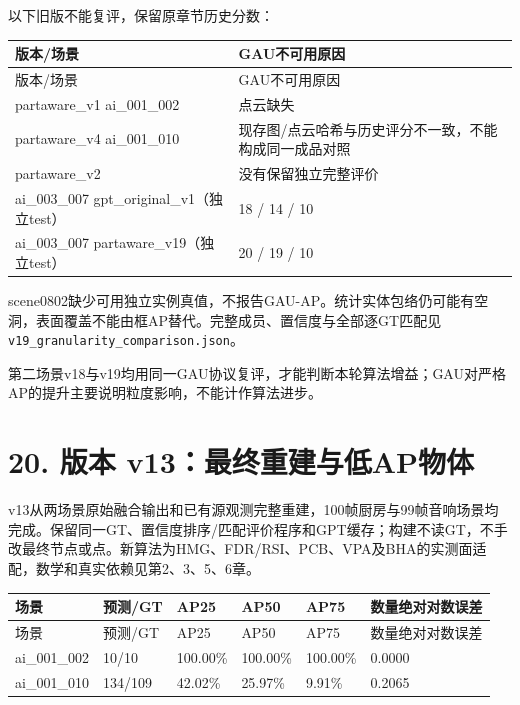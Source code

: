 \documentclass[UTF8,fontset=fandol]{ctexart}
\begin{document}
以下旧版不能复评，保留原章节历史分数：



{\small
\begin{longtable}{|p{}|p{}|}
\hline
版本/场景 & GAU不可用原因 \\ \hline
\endfirsthead
\hline
版本/场景 & GAU不可用原因 \\ \hline
\endhead
partaware\_v1 ai\_001\_002 & 点云缺失 \\ \hline
partaware\_v4 ai\_001\_010 & 现存图/点云哈希与历史评分不一致，不能构成同一成品对照 \\ \hline
partaware\_v2 & 没有保留独立完整评价 \\ \hline
ai\_003\_007 gpt\_original\_v1（独立test） & 18 / 14 / 10 \\ \hline
ai\_003\_007 partaware\_v19（独立test） & 20 / 19 / 10 \\ \hline
\end{longtable}
}

scene0802缺少可用独立实例真值，不报告GAU-AP。统计实体包络仍可能有空洞，表面覆盖不能由框AP替代。完整成员、置信度与全部逐GT匹配见 \texttt{v19\_\allowbreak{}granularity\_\allowbreak{}comparison.\allowbreak{}json}。



第二场景v18与v19均用同一GAU协议复评，才能判断本轮算法增益；GAU对严格AP的提升主要说明粒度影响，不能计作算法进步。



\section*{20. 版本 v13：最终重建与低AP物体}

v13从两场景原始融合输出和已有源观测完整重建，100帧厨房与99帧音响场景均完成。保留同一GT、置信度排序/匹配评价程序和GPT缓存；构建不读GT，不手改最终节点或点。新算法为HMG、FDR/RSI、PCB、VPA及BHA的实测面适配，数学和真实依赖见第2、3、5、6章。



{\small
\begin{longtable}{|p{}|p{}|p{}|p{}|p{}|p{}|}
\hline
场景 & 预测/GT & AP25 & AP50 & AP75 & 数量绝对对数误差 \\ \hline
\endfirsthead
\hline
场景 & 预测/GT & AP25 & AP50 & AP75 & 数量绝对对数误差 \\ \hline
\endhead
ai\_001\_002 & 10/10 & 100.00\% & 100.00\% & 100.00\% & 0.0000 \\ \hline
ai\_001\_010 & 134/109 & 42.02\% & 25.97\% & 9.91\% & 0.2065 \\ \hline
\end{longtable}
}
\end{document}
